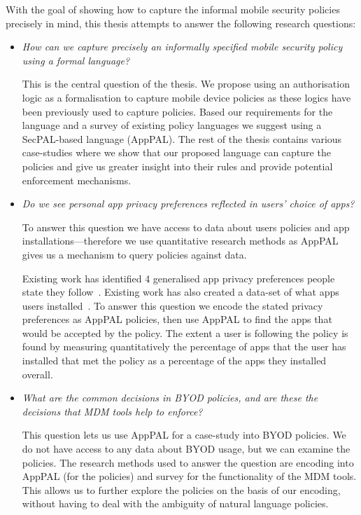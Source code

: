 \documentclass[thesis.tex]{subfiles}
\begin{document}
With the goal of showing how to capture the informal mobile security
policies precisely in mind, this thesis attempts to answer the
following research questions:

\begin{itemize}
\item \emph{How can we capture precisely an informally specified
    mobile security policy using a formal language?}
  
  This is the central question of the thesis.  We propose using an
  authorisation logic as a formalisation to capture mobile device
  policies as these logics have been previously used to capture
  policies.  Based our requirements for the language and a survey of
  existing policy languages we suggest using a SecPAL-based language
  (AppPAL).  The rest of the thesis contains various case-studies where
  we show that our proposed language can capture the policies and give
  us greater insight into their rules and provide potential enforcement
  mechanisms.
    
\item \emph{Do we see personal app privacy preferences reflected in
    users' choice of apps?}
  
  To answer this question we have access to data about users policies
  and app installations---therefore we use quantitative research methods
  as AppPAL gives us a mechanism to query policies against data.

  Existing work has identified 4 generalised app privacy preferences
  people state they follow~\cite{lin_modeling_2014}.  Existing work has
  also created a data-set of what apps users
  installed~\cite{oliner_carat:_2013}.  To answer this question we
  encode the stated privacy preferences as AppPAL policies, then use
  AppPAL to find the apps that would be accepted by the policy.  The
  extent a user is following the policy is found by measuring
  quantitatively the percentage of apps that the user has installed that
  met the policy as a percentage of the apps they installed overall.

\item \emph{What are the common decisions in \ac{BYOD} policies, and
    are these the decisions that \ac{MDM} tools help to enforce?}

  This question lets us use AppPAL for a case-study into \ac{BYOD}
  policies.  We do not have access to any data about \ac{BYOD} usage,
  but we can examine the policies.  The research methods used to answer
  the question are encoding into AppPAL (for the policies) and survey
  for the functionality of the \ac{MDM} tools.  This allows us to
  further explore the policies on the basis of our encoding, without
  having to deal with the ambiguity of natural language policies.
  

\end{itemize}
\end{document}
